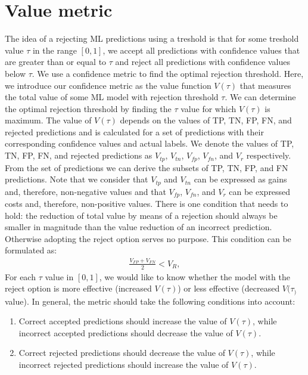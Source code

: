 \section{Value metric}
\label{sec:value-metric}
The idea of a rejecting ML predictions using a treshold is that for some treshold value $\tau$ in the range $[0, 1]$, we accept all predictions with confidence values that are greater than or equal to $\tau$ and reject all predictions with confidence values below $\tau$.
%
We use a confidence metric to find the optimal rejection threshold.
%
Here, we introduce our confidence metric as the value function $V(\tau)$ that measures the total value of some ML model with rejection threshold $\tau$.
%
We can determine the optimal rejection threshold by finding the $\tau$ value for which $V(\tau)$ is maximum.
%
The value of $V(\tau)$ depends on the values of TP, TN, FP, FN, and rejected predictions and is calculated for a set of predictions with their corresponding confidence values and actual labels.
%
We denote the values of TP, TN, FP, FN, and rejected predictions as $V_{tp}$, $V_{tn}$, $V_{fp}$, $V_{fn}$, and $V_r$ respectively.
%
From the set of predictions we can derive the subsets of TP, TN, FP, and FN predictions.
%
Note that we consider that $V_{tp}$ and $V_{tn}$ can be expressed as gains and, therefore, non-negative values and that $V_{fp}$, $V_{fn}$, and $V_{r}$ can be expressed costs and, therefore, non-positive values.
%
There is one condition that needs to hold: the reduction of total value by means of a rejection should always be smaller in magnitude than the value reduction of an incorrect prediction.
%
Otherwise adopting the reject option serves no purpose.
%
This condition can be formulated as:
% 
\begin{align}
    \label{for:value-condition}
    \frac{V_{FP} + V_{FN}}{2} < V_R,
\end{align}
%
For each $\tau$ value in $[0, 1]$, we would like to know whether the model with the reject option is more effective (increased $V(\tau)$) or less effective (decreased $V(\tau_)$ value).
%
In general, the metric should take the following conditions into account:
% 
\begin{enumerate}
    \item Correct accepted predictions should increase the value of $V(\tau)$, while incorrect accepted predictions should decrease the value of $V(\tau)$.
    \item Correct rejected predictions should decrease the value of $V(\tau)$, while incorrect rejected predictions should increase the value of $V(\tau)$.
\end{enumerate}
